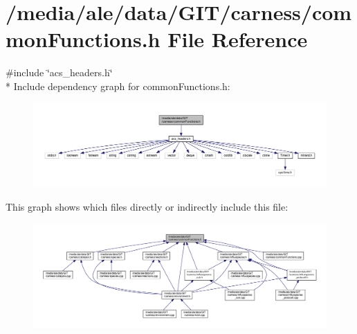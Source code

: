\hypertarget{a00028}{\section{/media/ale/data/\-G\-I\-T/carness/common\-Functions.h File Reference}
\label{a00028}
}
{\ttfamily \#include \char`\"{}acs\-\_\-headers.\-h\char`\"{}}\\*
Include dependency graph for common\-Functions.\-h\-:\nopagebreak
\begin{figure}[H]
\begin{center}
\leavevmode
\includegraphics[width=350pt]{a00056}
\end{center}
\end{figure}
This graph shows which files directly or indirectly include this file\-:\nopagebreak
\begin{figure}[H]
\begin{center}
\leavevmode
\includegraphics[width=350pt]{a00057}
\end{center}
\end{figure}
